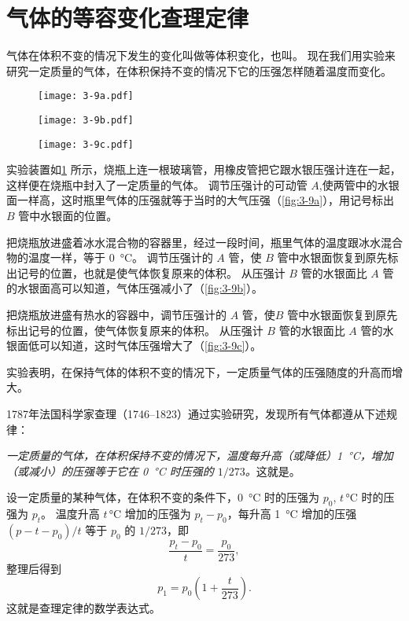 \section{气体的等容变化\texorpdfstring{\quad}{ }查理定律}
气体在体积不变的情况下发生的变化叫做等体积变化，也叫。
现在我们用实验来研究一定质量的气体，在体积保持不变的情况下它的压强怎样随着温度而变化。
\begin{figure}
	\begin{minipage}[b]{0.3\linewidth}\centering 
		\texttt{[image: 3-9a.pdf]}
		\label{fig:3-9a}
	\end{minipage}
	\begin{minipage}[b]{0.34\linewidth}\centering
		\texttt{[image: 3-9b.pdf]}
		\label{fig:3-9b}
	\end{minipage}
	\begin{minipage}[b]{0.34\linewidth}\centering
		\texttt{[image: 3-9c.pdf]}
		\label{fig:3-9c}
	\end{minipage}
	\caption{}\label{fig:3-9}
\end{figure}

实验装置如\cref{fig:3-9} 所示，烧瓶上连一根玻璃管，用橡皮管把它跟水银压强计连在一起，这样便在烧瓶中封入了一定质量的气体。
调节压强计的可动管 $A$,使两管中的水银面一样高，这时瓶里气体的压强就等于当时的大气压强（\cref{fig:3-9a}），用记号标出 $B$ 管中水银面的位置。

把烧瓶放进盛着冰水混合物的容器里，经过一段时间，瓶里气体的温度跟冰水混合物的温度一样，等于 \qty{0}{\celsius}。
调节压强计的 $A$ 管，使 $B$ 管中水银面恢复到原先标出记号的位置，也就是使气体恢复原来的体积。
从压强计 $B$ 管的水银面比 $A$ 管的水银面高可以知道，气体压强减小了（\cref{fig:3-9b}）。

把烧瓶放进盛有热水的容器中，调节压强计的 $A$ 管，使$ B$ 管中水银面恢复到原先标出记号的位置，使气体恢复原来的体积。
从压强计 $B$ 管的水银面比 $A$ 管的水银面低可以知道，这时气体压强增大了（\cref{fig:3-9c}）。

实验表明，在保持气体的体积不变的情况下，一定质量气体的压强随度的升高而增大。

1787年法国科学家查理（1746--1823）通过实验研究，发现所有气体都遵从下述规律：

\emph{一定质量的气体，在体积保持不变的情况下，温度每升高（或降低）\qty{1}{\celsius}，增加（或减小）的压强等于它在 \qty{0}{\celsius} 时压强的 $1/273$。}这就是。

设一定质量的某种气体，在体积不变的条件下，\qty{0}{\celsius} 时的压强为 $p_0$, $t$\,\unit{\celsius} 时的压强为 $p_t$。
温度升高 $t$\,\unit{\celsius} 增加的压强为 $p_t-p_0$，每升高 \qty{1}{\celsius} 增加的压强 $(p-t-p_0)/t$ 等于 $p_0$ 的 $1/273$，即
\[\frac{p_t-p_0}{t}=\frac{p_0}{273},\]
整理后得到
\[p_1=p_0 \left(1+\frac{t}{273}\right).\]
这就是查理定律的数学表达式。

